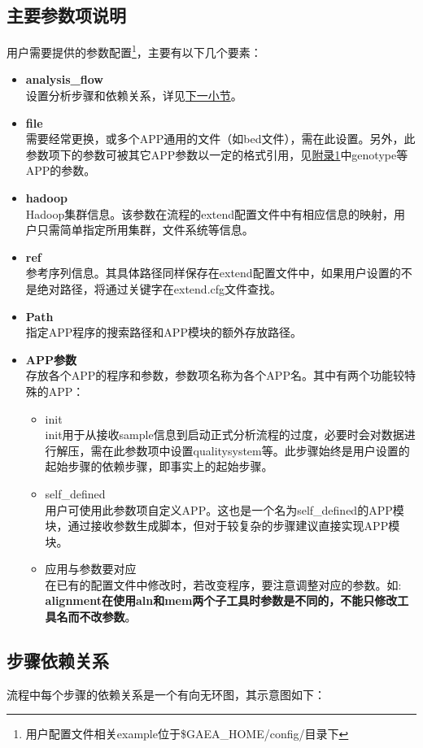 \documentclass[UTF8,10pt,a4paper]{ctexart}
\begin{document}
\subsection{主要参数项说明}
用户需要提供的参数配置\footnote{用户配置文件相关example位于\$GAEA\_HOME/config/目录下}，主要有以下几个要素：
\begin{itemize}
\item \textbf{analysis\_flow}\\
设置分析步骤和依赖关系，详见{\kaishu \hyperref[subs5.3]{下一小节}}。
\item \textbf{file}\\
需要经常更换，或多个APP通用的文件（如bed文件），需在此设置。另外，此参数项下的参数可被其它APP参数以一定的格式引用，见{\kaishu \hyperref[B]{附录1}}中genotype等APP的参数。
\item \textbf{hadoop}\\
Hadoop集群信息。该参数在流程的extend配置文件中有相应信息的映射，用户只需简单指定所用集群，文件系统等信息。
\item \textbf{ref}\\
参考序列信息。其具体路径同样保存在extend配置文件中，如果用户设置的不是绝对路径，将通过关键字在extend.cfg文件查找。
\item \textbf{Path}\\
指定APP程序的搜索路径和APP模块的额外存放路径。
\item \textbf{APP参数}\\
存放各个APP的程序和参数，参数项名称为各个APP名。其中有两个功能较特殊的APP：
\begin{itemize}
\item  init \\
init用于从接收sample信息到启动正式分析流程的过度，必要时会对数据进行解压，需在此参数项中设置qualitysystem等。此步骤始终是用户设置的起始步骤的依赖步骤，即事实上的起始步骤。
\item  self\_defined \\
用户可使用此参数项自定义APP。这也是一个名为self\_defined的APP模块，通过接收参数生成脚本，但对于较复杂的步骤建议直接实现APP模块。
\item  应用与参数要对应 \\
在已有的配置文件中修改时，若改变程序，要注意调整对应的参数。如: {\kaishu\textbf{alignment在使用aln和mem两个子工具时参数是不同的，不能只修改工具名而不改参数}}。
\end{itemize}

\end{itemize}


\subsection{步骤依赖关系}
\label{subs5.3}
流程中每个步骤的依赖关系是一个有向无环图，其示意图如下：%
\end{document}
